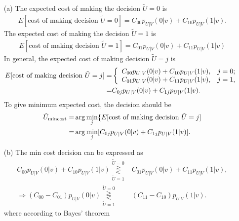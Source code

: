 \documentclass{assignment}
\begin{document}
\begin{sol}
    \begin{itemize}
        \item[(a)] The expected cost of making the decision $\tilde{U}=0$ is
        \begin{align}
            E[\text{cost of making decision }\tilde{U}=0]=C_{00}p_{U\vert V}(0\vert v)+C_{10}p_{U\vert V}(1\vert v).
        \end{align}
        The expected cost of making the decision $\tilde{U}=1$ is
        \begin{align}
            E[\text{cost of making decision }\tilde{U}=1]=C_{01}p_{U\vert V}(0\vert v)+C_{11}p_{U\vert V}(1\vert v)
        \end{align}
        In general, the expected cost of making decision $\tilde{U}=j$ is
        \begin{align}
            \notag E[\text{cost of making decision }\tilde{U}=j]=&\left\{\begin{array}{ll}
                C_{00}p_{U\vert V}(0\vert v)+C_{10}p_{U\vert V}(1\vert v),&j=0;\\
                C_{01}p_{U\vert V}(0\vert v)+C_{11}p_{U\vert V}(1\vert v),&j=1,
            \end{array}\right.\\
            =&C_{0j}p_{U\vert V}(0\vert v)+C_{1j}p_{U\vert V}(1\vert v).
        \end{align}
        To give minimum expected cost, the decision should be
        \begin{align}
            \notag\tilde{U}_{\text{mincost}}=&\arg\min_j\{E[\text{cost of making decision }\tilde{U}=j]\\
            =&\arg\min_j[C_{0j}p_{U\vert V}(0\vert v)+C_{1j}p_{U\vert V}(1\vert v)].
        \end{align}
        \item[(b)] The min cost decision can be expressed as
        \begin{align}
            C_{00}p_{U\vert V}(0\vert v)+C_{10}p_{U\vert V}(1\vert v)\overset{\tilde{U}=0}{\underset{\tilde{U}=1}{\gtreqless}}&C_{01}p_{U\vert V}(0\vert v)+C_{11}p_{U\vert V}(1\vert v),\\
            \Longrightarrow(C_{00}-C_{01})p_{U\vert V}(0\vert v)\overset{\tilde{U}=0}{\underset{\tilde{U}=1}{\gtreqless}}&(C_{11}-C_{10})p_{U\vert V}(1\vert v).
        \end{align}
        where according to Bayes' theorem
        \begin{align}

\end{align}
\end{itemize}
\end{sol}
\end{document}
